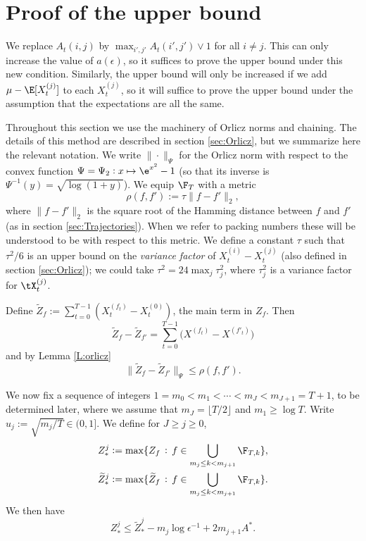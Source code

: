 \documentclass[11pt]{amsart}
\begin{document}
\newcommand{\tZ}{\widetilde{Z}}
\section{Proof of the upper bound}  \label{sec:equalupper}
We replace $A_{t}(i,j)$ by $\max_{i',j'}A_{t}(i',j')\vee 1$ for all $i\ne j$. 
This can only increase the value of $a(\epsilon)$,
so it suffices to prove the upper bound under this new condition. Similarly,
the upper bound will only be increased if we add $\mu - \E[X_t^{(j)}]$ to each
$X_{t}^{(j)}$, so it will suffice to prove the upper bound under the assumption
that the expectations are all the same. 

Throughout this section we use the machinery of Orlicz norms and chaining.
The details of this method are described in section \ref{sec:Orlicz}, but we summarize here the relevant notation.
We write $\|\cdot\|_\Psi$ for the Orlicz norm with respect to the convex function $\Psi=\Psi_2:x\mapsto \e^{x^2}-1$ (so that its inverse is $\Psi^{-1}(y)=\sqrt{\log(1+y)}$).
We equip $\F_T$ with a metric 
\begin{equation}
	\label{E:definerho}
	\rho(f,f'):=\tau\|f-f'\|_2,
\end{equation}
where $\|f-f'\|_2$ is the square root of the Hamming distance between $f$ and $f'$ (as in section \ref{sec:Trajectories}).
When we refer to packing numbers these will be understood to be with respect to this metric.
We define a constant $\tau$ such that $\tau^2/6$ is an upper bound on the {\em variance factor} of $X_t^{(i)} - X_t^{(j)}$ (also defined in section \ref{sec:Orlicz}); 
we could take $\tau^2=24 \max_j \tau_j^2$, where $\tau_j^2$ is a variance factor for $\tX_t^{(j)}$.

Define $\tZ_f:= \sum_{t=0}^{T-1} (X_t^{(f_t)} - X_t^{(0)})$, the main term in $Z_f$. 
Then
$$
\tZ_{f} - \tZ_{f'}=\sum_{t=0}^{T-1} 
\bigl( X^{(f_{t})}- X^{(f'_{t})}\bigr) 
$$
and by Lemma \ref{L:orlicz}
$$
\| \tZ_{f}- \tZ_{f'}\|_{\Psi} \le \rho(f,f').
$$

We now fix a sequence of integers ${1=m_{0}<m_{1}<\cdots<m_{J}<m_{J+1}=T+1}$,
to be determined later, where we assume that $m_{J}=\lfloor T/2\rfloor$ and $m_1 \ge \log T$.
Write ${u_j:= \sqrt{m_j/T} \in (0,1]}$.
We define for $J\ge j\ge 0$,
\begin{equation}  \label{E:alphadef}
\begin{split}
Z_{*}^{j}&:=\max\{ Z_f \, : \, f\in \bigcup_{m_{j}\le k< m_{j+1}} \F_{T,k} \},\\
\tZ_{*}^{j}&:=\max\{ \tZ_f \, : \, f\in \bigcup_{m_{j}\le k< m_{j+1}} \F_{T,k} \}.
\end{split}
\end{equation}
We then have 
\begin{equation} \label{E:ZandZtilde}
	Z_*^{j} \le \tZ_*^{j} - m_j \log \epsilon^{-1} + 2m_{j+1} A^* .
\end{equation}
\end{document}
